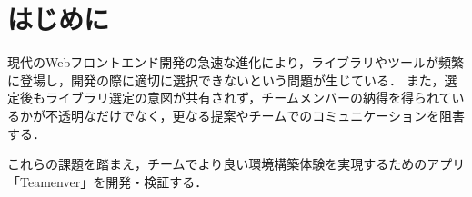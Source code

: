 \documentclass[main]{subfiles}
\begin{document}
\section{はじめに }
現代のWebフロントエンド開発の急速な進化により，ライブラリやツールが頻繁に登場し，開発の際に適切に選択できないという問題が生じている\cite{medium.com}．
また，選定後もライブラリ選定の意図が共有されず，チームメンバーの納得を得られているかが不透明なだけでなく，更なる提案やチームでのコミュニケーションを阻害する．

これらの課題を踏まえ，チームでより良い環境構築体験を実現するためのアプリ「Teamenver」を開発・検証する．
\end{document}

